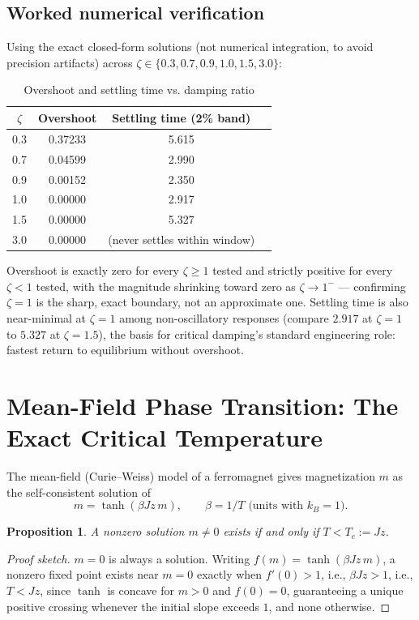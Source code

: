 \documentclass[10pt,journal,compsoc]{IEEEtran}
\newtheorem{proposition}{Proposition}
\begin{document}
\subsection{Worked numerical verification}
Using the exact closed-form solutions (not numerical integration, to avoid precision artifacts) across $\zeta\in\{0.3,0.7,0.9,1.0,1.5,3.0\}$:

\begin{table}[ht]
\centering
\caption{Overshoot and settling time vs. damping ratio}
\begin{tabular}{cccc}
\toprule
$\zeta$ & Overshoot & Settling time (2\% band) \\
\midrule
0.3 & 0.37233 & 5.615 \\
0.7 & 0.04599 & 2.990 \\
0.9 & 0.00152 & 2.350 \\
1.0 & 0.00000 & 2.917 \\
1.5 & 0.00000 & 5.327 \\
3.0 & 0.00000 & (never settles within window) \\
\bottomrule
\end{tabular}
\end{table}

\noindent Overshoot is exactly zero for every $\zeta\ge1$ tested and strictly positive for every $\zeta<1$ tested, with the magnitude shrinking toward zero as $\zeta\to1^-$ — confirming $\zeta=1$ is the sharp, exact boundary, not an approximate one. Settling time is also near-minimal at $\zeta=1$ among non-oscillatory responses (compare $2.917$ at $\zeta=1$ to $5.327$ at $\zeta=1.5$), the basis for critical damping's standard engineering role: fastest return to equilibrium without overshoot.

\section{Mean-Field Phase Transition: The Exact Critical Temperature}
The mean-field (Curie--Weiss) model of a ferromagnet gives magnetization $m$ as the self-consistent solution of
\begin{equation}
    m = \tanh(\beta J z\, m), \qquad \beta=1/T \text{ (units with }k_B=1\text{)}.
\end{equation}

\begin{proposition}
A nonzero solution $m\ne0$ exists if and only if $T<T_c := Jz$.
\end{proposition}
\begin{proof}[Proof sketch]
$m=0$ is always a solution. Writing $f(m)=\tanh(\beta Jz\,m)$, a nonzero fixed point exists near $m=0$ exactly when $f'(0)>1$, i.e., $\beta Jz>1$, i.e., $T<Jz$, since $\tanh$ is concave for $m>0$ and $f(0)=0$, guaranteeing a unique positive crossing whenever the initial slope exceeds $1$, and none otherwise.
\end{proof}
\end{document}
